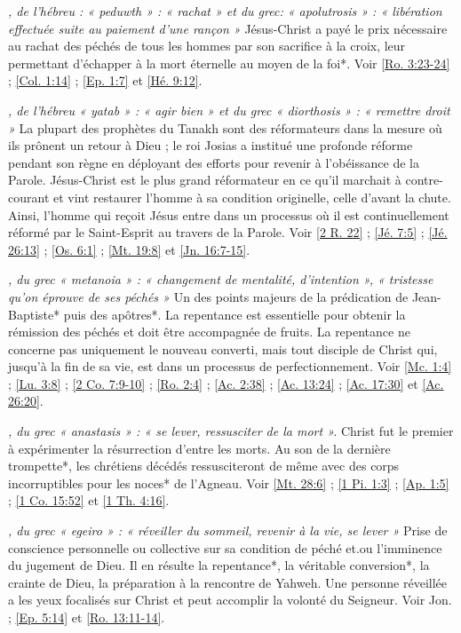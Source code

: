 \begin{multicols}{2}
\textit{, de l'hébreu : « peduwth » : « rachat » et du grec: « apolutrosis » : « libération effectuée suite au paiement d'une rançon »}\newline
Jésus-Christ a payé le prix nécessaire au rachat des péchés de tous les hommes par son sacrifice à la croix, leur permettant d'échapper à la mort éternelle au moyen de la foi*. Voir \vref{Ro. 3:23-24} ; \vref{Col. 1:14} ; \vref{Ep. 1:7} et \vref{Hé. 9:12}.

\textit{, de l'hébreu « yatab » : « agir bien » et du grec « diorthosis » : « remettre droit »}\newline
La plupart des prophètes du Tanakh sont des réformateurs dans la mesure où ils prônent un retour à Dieu ; le roi Josias a institué une profonde réforme pendant son règne en déployant des efforts pour revenir à l'obéissance de la Parole. Jésus-Christ est le plus grand réformateur en ce qu'il marchait à contre-courant et vint restaurer l'homme à sa condition originelle, celle d'avant la chute. Ainsi, l'homme qui reçoit Jésus entre dans un processus où il est continuellement réformé par le Saint-Esprit au travers de la Parole. Voir \vref{2 R. 22} ; \vref{Jé. 7:5} ; \vref{Jé. 26:13} ; \vref{Os. 6:1} ; \vref{Mt. 19:8} et \vref{Jn. 16:7-15}.

\textit{, du grec « metanoia » : « changement de mentalité, d'intention », « tristesse qu'on éprouve de ses péchés »}\newline
Un des points majeurs de la prédication de Jean-Baptiste* puis des apôtres*. La repentance est essentielle pour obtenir la rémission des péchés et doit être accompagnée de fruits. La repentance ne concerne pas uniquement le nouveau converti, mais tout disciple de Christ qui, jusqu'à la fin de sa vie, est dans un processus de perfectionnement. Voir \vref{Mc. 1:4} ; \vref{Lu. 3:8} ; \vref{2 Co. 7:9-10} ; \vref{Ro. 2:4} ; \vref{Ac. 2:38} ; \vref{Ac. 13:24} ; \vref{Ac. 17:30} et \vref{Ac. 26:20}.

\textit{, du grec « anastasis » : « se lever, ressusciter de la mort ».}\newline
Christ fut le premier à expérimenter la résurrection d'entre les morts. Au son de la dernière trompette*, les chrétiens décédés ressusciteront de même avec des corps incorruptibles pour les noces* de l'Agneau. Voir \vref{Mt. 28:6} ; \vref{1 Pi. 1:3} ; \vref{Ap. 1:5} ; \vref{1 Co. 15:52} et \vref{1 Th. 4:16}.

\textit{, du grec « egeiro » : « réveiller du sommeil, revenir à la vie, se lever »}\newline
Prise de conscience personnelle ou collective sur sa condition de péché et.ou l'imminence du jugement de Dieu. Il en résulte la repentance*, la véritable conversion*, la crainte de Dieu, la préparation à la rencontre de Yahweh. Une personne réveillée a les yeux focalisés sur Christ et peut accomplir la volonté du Seigneur. Voir Jon. ; \vref{Ep. 5:14} et \vref{Ro. 13:11-14}.


\end{multicols}
